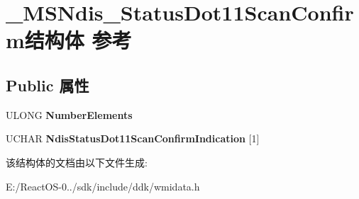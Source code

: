 \hypertarget{struct___m_s_ndis___status_dot11_scan_confirm}{}\section{\+\_\+\+M\+S\+Ndis\+\_\+\+Status\+Dot11\+Scan\+Confirm结构体 参考}
\label{struct___m_s_ndis___status_dot11_scan_confirm}
\subsection*{Public 属性}
\begin{DoxyCompactItemize}
\item 
\mbox{\label{struct___m_s_ndis___status_dot11_scan_confirm_a192a17d1040c61f78f97b7fda136d704}} 
U\+L\+O\+NG {\bfseries Number\+Elements}
\item 
\mbox{\label{struct___m_s_ndis___status_dot11_scan_confirm_a597b2d27b3b3a820ed51b7299f6f3cc1}} 
U\+C\+H\+AR {\bfseries Ndis\+Status\+Dot11\+Scan\+Confirm\+Indication} \mbox{[}1\mbox{]}
\end{DoxyCompactItemize}


该结构体的文档由以下文件生成\+:\begin{DoxyCompactItemize}
\item 
E\+:/\+React\+O\+S-\/0../sdk/include/ddk/wmidata.\+h\end{DoxyCompactItemize}
